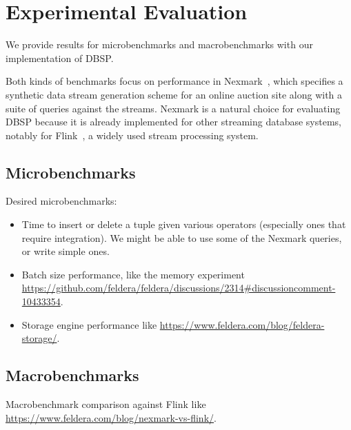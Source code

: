 \section{Experimental Evaluation}\label{sec:experiments}

We provide results for microbenchmarks and macrobenchmarks with our
implementation of DBSP.

Both kinds of benchmarks focus on performance in
Nexmark~\cite{tucker2008nexmark}, which specifies a synthetic data
stream generation scheme for an online auction site along with a suite
of queries against the streams.  Nexmark is a natural choice for
evaluating DBSP because it is already implemented for other streaming
database systems, notably for Flink~\cite{carbone-ieee15,
  nexmark-flink}, a widely used stream processing system.

\subsection{Microbenchmarks}

Desired microbenchmarks:

\begin{itemize}
\item Time to insert or delete a tuple given various operators
  (especially ones that require integration).  We might be able to use
  some of the Nexmark queries, or write simple ones.

\item Batch size performance, like the memory experiment
  \url{https://github.com/feldera/feldera/discussions/2314#discussioncomment-10433354}.

\item Storage engine performance like
  \url{https://www.feldera.com/blog/feldera-storage/}.
\end{itemize}

\subsection{Macrobenchmarks}

Macrobenchmark comparison against Flink like
\url{https://www.feldera.com/blog/nexmark-vs-flink/}.

